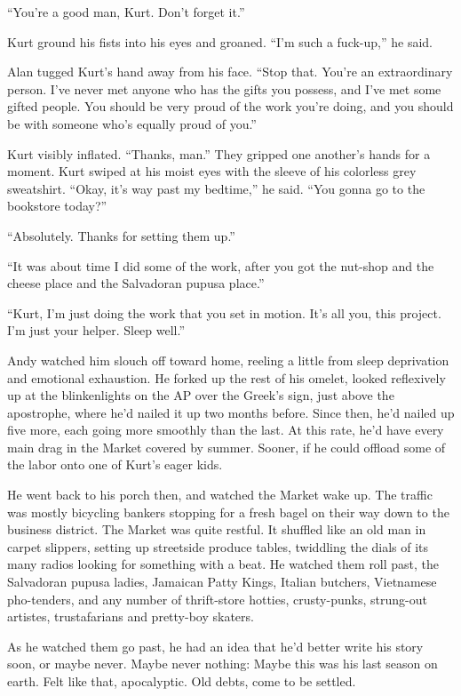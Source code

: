 ``You're a good man, Kurt.  Don't forget it.''

Kurt ground his fists into his eyes and groaned.  ``I'm such a
fuck-up,'' he said.

Alan tugged Kurt's hand away from his face.  ``Stop that.  You're an
extraordinary person.  I've never met anyone who has the gifts you
possess, and I've met some gifted people.  You should be very proud of
the work you're doing, and you should be with someone who's equally
proud of you.''

Kurt visibly inflated.  ``Thanks, man.'' They gripped one another's
hands for a moment.  Kurt swiped at his moist eyes with the sleeve of
his colorless grey sweatshirt.  ``Okay, it's way past my bedtime,'' he
said.  ``You gonna go to the bookstore today?''

``Absolutely.  Thanks for setting them up.''

``It was about time I did some of the work, after you got the nut-shop
and the cheese place and the Salvadoran pupusa place.''

``Kurt, I'm just doing the work that you set in motion.  It's all you,
this project.  I'm just your helper.  Sleep well.''

Andy watched him slouch off toward home, reeling a little from sleep
deprivation and emotional exhaustion.  He forked up the rest of his
omelet, looked reflexively up at the blinkenlights on the AP over the
Greek's sign, just above the apostrophe, where he'd nailed it up two
months before.  Since then, he'd nailed up five more, each going more
smoothly than the last.  At this rate, he'd have every main drag in
the Market covered by summer.  Sooner, if he could offload some of the
labor onto one of Kurt's eager kids.

He went back to his porch then, and watched the Market wake up.  The
traffic was mostly bicycling bankers stopping for a fresh bagel on
their way down to the business district.  The Market was quite
restful.  It shuffled like an old man in carpet slippers, setting up
streetside produce tables, twiddling the dials of its many radios
looking for something with a beat.  He watched them roll past, the
Salvadoran pupusa ladies, Jamaican Patty Kings, Italian butchers,
Vietnamese pho-tenders, and any number of thrift-store hotties,
crusty-punks, strung-out artistes, trustafarians and pretty-boy
skaters.

As he watched them go past, he had an idea that he'd better write his
story soon, or maybe never.  Maybe never nothing:  Maybe this was his
last season on earth.  Felt like that, apocalyptic.  Old debts, come
to be settled.

